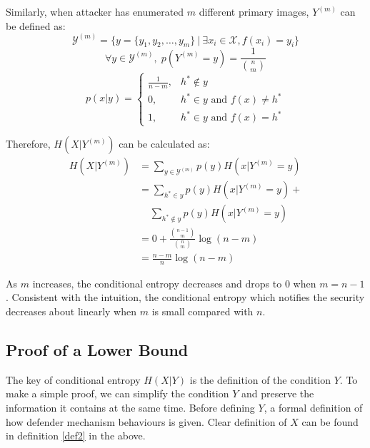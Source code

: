 \documentclass[10pt, conference, compsocconf]{IEEEtran}
\begin{document}
		Similarly, when attacker has enumerated $m$ different primary images, $Y^{(m)}$ can be defined
		as:
		\begin{equation*}
			\mathcal Y^{(m)} = \{ y = \{y_1, y_2, \ldots, y_m\} \: | \: \exists x_i \in \mathcal X, f(x_i) = y_i\}
		\end{equation*}
		\begin{equation*}
			\forall y \in \mathcal Y^{(m)}, \; p(Y^{(m)} = y) = \frac{1}{\binom{n}{m}}
		\end{equation*}
		\begin{equation*}
			p(x|y) = \begin{cases}
				\frac{1}{n-m}, &h^* \notin y\\
				0, &h^* \in y \text{ and } f(x) \neq h^*\\
				1, &h^* \in y \text{ and } f(x) = h^*
			\end{cases}
		\end{equation*}
		
		Therefore, $H(X | Y^{(m)})$ can be calculated as:
		\begin{align*}
			H(X | Y^{(m)}) &= \sum_{y \in \mathcal Y^{(m)}} p(y) H(x | Y^{(m)} = y)\\
				&= \sum_{h^* \in y} p(y) H(x | Y^{(m)} = y) + \\
					& \;\;\;\; \sum_{h^* \notin y} p(y) H(x | Y^{(m)} = y)\\
				&= 0+\frac{\binom{n-1}{m}}{\binom{n}{m}} \log(n-m)\\
				&= \frac{n-m}{n} \log(n-m)
		\end{align*}
		
		As $m$ increases, 
		the conditional entropy decreases and drops to $0$ when $m = n-1$. 
		Consistent with the intuition, the conditional
		entropy which notifies the security decreases about linearly when $m$ is small 
		compared with $n$.
		
	\subsection{Proof of a Lower Bound}
		The key
		of conditional entropy $H(X|Y)$ is the definition of the condition $Y$.
		To make a simple proof, we can simplify the
		condition $Y$ and preserve the information it contains
		at the same time. Before defining $Y$, a
		formal definition of how defender mechanism behaviours is given. Clear
		definition of $X$ can be found in definition \ref{def2} in the above.
		
\end{document}
